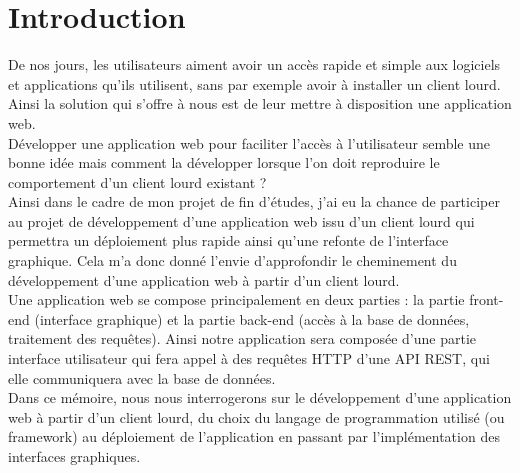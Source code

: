 \documentclass[a4paper, 12pt, french]{article}
\begin{document}
	\newpage
		
	
	\listoffigures
	

	\listoftables
	\newpage

	\printglossary

	\newpage
	
	\singlespacing

	\section*{Introduction}%
	De nos jours, les utilisateurs aiment avoir un accès rapide et simple aux logiciels et applications qu’ils utilisent, sans par exemple avoir à installer un client lourd. Ainsi la solution qui s’offre à nous est de leur mettre à disposition une application web.\\

Développer une application web pour faciliter l’accès à l’utilisateur semble une bonne idée mais comment la développer lorsque l’on doit reproduire le comportement d’un client lourd existant ?\\

Ainsi dans le cadre de mon projet de fin d’études, j’ai eu la chance de participer au projet de développement d’une application web issu d’un client lourd qui permettra un déploiement plus rapide ainsi qu’une refonte de l’interface graphique. Cela m’a donc donné l’envie d’approfondir le cheminement du développement d’une application web à partir d’un client lourd.\\

Une application web se compose principalement en deux parties : la partie front-end (interface graphique) et la partie back-end (accès à la base de données, traitement des requêtes). Ainsi notre application sera composée d’une partie interface utilisateur qui fera appel à des requêtes HTTP d’une API REST, qui elle communiquera avec la base de données.\\

Dans ce mémoire, nous nous interrogerons sur le développement d’une application web à partir d’un client lourd, du choix du langage de programmation utilisé (ou framework) au déploiement de l’application en passant par l’implémentation des interfaces graphiques.\\
\end{document}
